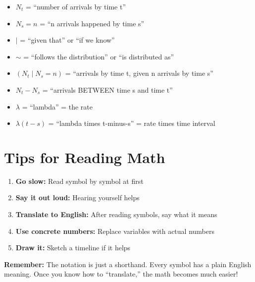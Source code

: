 \documentclass[11pt]{article}
\begin{document}
\begin{tcolorbox}[colback=green!10!white,colframe=green!75!black,title=Notation Cheat Sheet]
\begin{itemize}
    \item $N_t$ = ``number of arrivals by time t''
    \item $N_s = n$ = ``n arrivals happened by time s''
    \item $\mid$ = ``given that'' or ``if we know''
    \item $\sim$ = ``follows the distribution'' or ``is distributed as''
    \item $(N_t \mid N_s = n)$ = ``arrivals by time t, given n arrivals by time s''
    \item $N_t - N_s$ = ``arrivals BETWEEN time s and time t''
    \item $\lambda$ = ``lambda'' = the rate
    \item $\lambda(t-s)$ = ``lambda times t-minus-s'' = rate times time interval
\end{itemize}
\end{tcolorbox}

\section{Tips for Reading Math}

\begin{enumerate}
    \item \textbf{Go slow:} Read symbol by symbol at first
    \item \textbf{Say it out loud:} Hearing yourself helps
    \item \textbf{Translate to English:} After reading symbols, say what it means
    \item \textbf{Use concrete numbers:} Replace variables with actual numbers
    \item \textbf{Draw it:} Sketch a timeline if it helps
\end{enumerate}

\begin{tcolorbox}[colback=blue!10!white,colframe=blue!75!black]
\textbf{Remember:} The notation is just a shorthand. Every symbol has a plain English meaning. Once you know how to ``translate,'' the math becomes much easier!
\end{tcolorbox}
\end{document}
